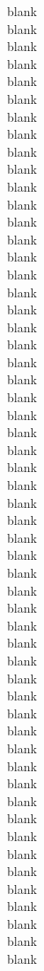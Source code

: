 \documentclass{article}
\begin{document}
\begin{multicols}{3}
blank\\
blank\\
blank\\
blank\\
blank\\
blank\\
blank\\
blank\\
blank\\
blank\\
blank\\
blank\\
blank\\
blank\\
blank\\
blank\\
blank\\
blank\\
blank\\
blank\\
blank\\
blank\\
blank\\
blank\\
blank\\
blank\\
blank\\
blank\\
blank\\
blank\\
blank\\
blank\\
blank\\
blank\\
blank\\
blank\\
blank\\
blank\\
blank\\
blank\\
blank\\
blank\\
blank\\
blank\\
blank\\
blank\\
blank\\
blank\\
blank\\
blank\\
blank\\
blank\\
blank\\
blank\\
blank\\

\end{multicols}
\end{document}
